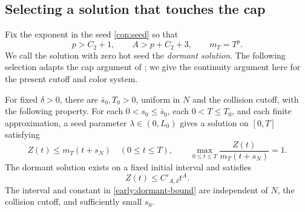 \subsection{Selecting a solution that touches the cap}

Fix the exponent in the seed \eqref{con:seed} so that
\begin{equation}\label{early:exponents}
 p>C_2+1,
 \qquad A>p+C_2+3,
 \qquad m_T=T^p.
\end{equation}
We call the solution with zero hot seed the \emph{dormant solution}.
The following selection adapts the cap argument of
\cite[Section~5]{OpenAIPeriodic}; we give the continuity argument here for
the present cutoff and color system.

\begin{proposition}\label{early:cap-selection}
For fixed $\delta>0$, there are $\bar s_0,T_0>0$, uniform in $N$ and
the collision cutoff, with the following property.
For each $0<s_0\le\bar s_0$, each $0<T\le T_0$, and each finite
approximation, a seed parameter
$\lambda\in(0,L_0)$ gives a solution on $[0,T]$ satisfying
\begin{equation}\label{early:cap}
 Z(t)\le m_T(t+s_N)\quad(0\le t\le T),
 \qquad
 \max_{0\le t\le T}\frac{Z(t)}{m_T(t+s_N)}=1.
\end{equation}
The dormant solution exists on a fixed initial interval and satisfies
\begin{equation}\label{early:dormant-bound}
 Z(t)\le C'_{A,\delta}t^A.
\end{equation}
The interval and constant in \eqref{early:dormant-bound} are independent
of $N$, the collision cutoff, and sufficiently small $s_0$.
\end{proposition}

